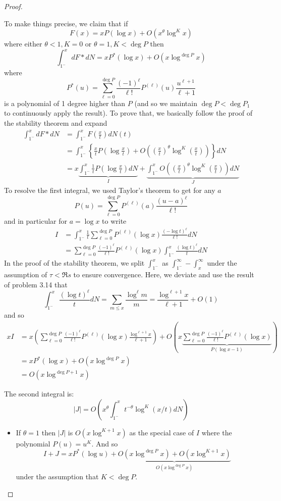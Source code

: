 \documentclass[12pt]{article}
\begin{document}
\begin{proof}
\begin{enumerate}
To make things precise, we claim that if
$$F(x) = x P(\log x) + O(x^\theta \log^K x)$$
where either $\theta < 1, K = 0$ or $\theta = 1, K < \deg P$ then
$$\int_{1^-}^x dF * dN = x P^*(\log x) + O(x \log^{\deg P} x)$$
where
$$P^*(u) = \sum_{\ell = 0}^{\deg P} \frac{(-1)^\ell}{\ell!} P^{(\ell)}(u) \frac{u^{\ell + 1}}{\ell + 1}$$
is a polynomial of 1 degree higher than $P$ (and so we maintain $\deg P < \deg P_1$ to continuously apply the result). To prove that, we basically follow the proof of the stability theorem and expand
\begin{align*}
\int_{1^-}^x dF * dN &= \int_{1^-}^x F\left(\frac x t\right) dN(t) \\
&= \int_{1^-}^x \left\{ \frac{x}{t} P\left(\log \frac x t\right) + O\left( \left(\frac x t \right)^\theta \log^K \left( \frac x t \right) \right) \right\} dN \\
&= x \underbrace{\int_{1^-}^x \frac{1}{t} P\left(\log \frac x t\right) dN}_{I} + \underbrace{\int_{1^-}^x O\left( \left(\frac x t \right)^\theta \log^K \left( \frac x t \right) \right) dN}_{J}
\end{align*}
To resolve the first integral, we used Taylor's theorem to get for any $a$
$$P(u) = \sum_{\ell=0}^{\deg P} P^{(\ell)}(a) \frac{(u - a)^\ell}{\ell!}$$
and in particular for $a = \log x$ to write
\begin{align*}
I &= \int_{1^-}^x \frac{1}{t} \sum_{\ell = 0}^{\deg P} P^{(\ell)}(\log x) \frac{(-\log t)^\ell}{\ell!} dN\\
&= \sum_{\ell = 0}^{\deg P} \frac{(-1)^\ell}{\ell!} P^{(\ell)}(\log x) \int_{1^-}^x \frac{(\log t)^\ell}{t} dN
\end{align*}
In the proof of the stability theorem, we split $\int_{1^-}^x$ as $\int_{1^-}^\infty - \int_x^\infty$ under the assumption of $\tau < \Re s$ to ensure convergence. Here, we deviate and use the result of problem 3.14 that
$$\int_{1^-}^x \frac{(\log t)^\ell}{t} dN = \sum_{m \leq x} \frac{\log^\ell m}{m} = \frac{\log^{\ell+1} x}{\ell + 1} + O(1)$$
and so
\begin{align*}
x I &= x \left( \sum_{\ell = 0}^{\deg P} \frac{(-1)^\ell}{\ell!} P^{(\ell)}(\log x) \frac{\log^{\ell + 1} x}{\ell + 1} \right) + O\left(x \underbrace{\sum_{\ell = 0}^{\deg P} \frac{(-1)^\ell}{\ell!} P^{(\ell)}(\log x)}_{P(\log x - 1)}\right)\\
&= x P^*(\log x) + O(x \log^{\deg P} x)\\
&= O(x \log^{\deg P + 1} x)
\end{align*}

The second integral is:
$$|J| = O\left( x^\theta \int_{1^-}^x t^{-\theta} \log^K(x/t) dN \right)$$
\begin{itemize}
\item If $\theta = 1$ then $|J|$ is $O(x \log^{K + 1} x)$ as the special case of $I$ where the polynomial $P(u) = u^K$. And so
$$I + J = x P^*(\log u) + \underbrace{O(x \log^{\deg P} x) + O(x \log^{K+1} x)}_{O(x \log^{\deg P} x)}$$
under the assumption that $K < \deg P$.


\end{itemize}
\end{enumerate}
\end{proof}
\end{document}
